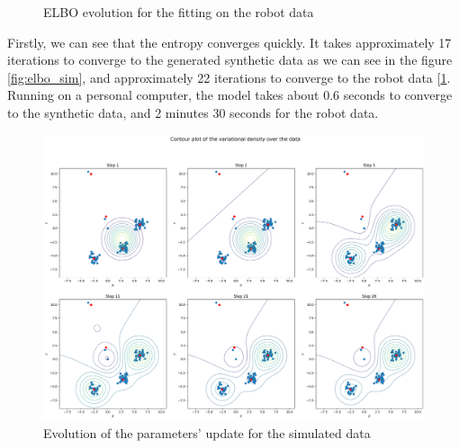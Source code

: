 \documentclass{article}
\begin{document}
\begin{figure}[H]
\begin{minipage}{0.45\textwidth}
        \caption{ELBO evolution for the fitting on the robot data}
        \label{fig:elbo_rob}
    \end{minipage}
\end{figure}

Firstly, we can see that the entropy converges quickly. It takes approximately 17 iterations to converge to the generated synthetic data as we can see in the figure \ref{fig:elbo_sim}, and approximately 22 iterations to converge to the robot data [\ref{fig:elbo_rob}. Running on a personal computer, the model takes about 0.6 seconds to converge to the synthetic data, and 2 minutes 30 seconds for the robot data.

\begin{figure}[H]
    \centering
    \includegraphics[scale=0.4]{images/sampled_evolution.png}
    \caption{Evolution of the parameters' update for the simulated data}
    \label{fig:alg_evol}
\end{figure}
\end{document}
